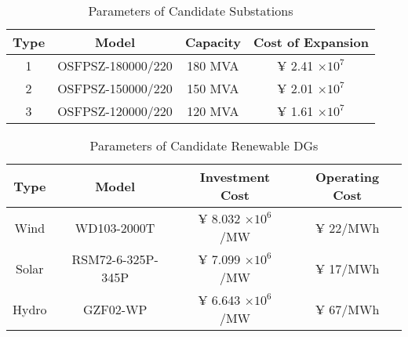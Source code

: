 \documentclass[a4paper,fleqn]{cas-dc}
\begin{document}
\begin{table}[htbp]\footnotesize
    \renewcommand{\familydefault}{\rmdefault}\normalfont
    \renewcommand{\arraystretch}{1.1}
    \setlength\tabcolsep{8pt}
    \centering
    {\color{blue}
    \caption{\textrm{Parameters of Candidate Substations}}
    \begin{tabularx}{\columnwidth}{cccc}
    \hline
    Type  & Model & Capacity & Cost of Expansion \\
    \hline
    1    & OSFPSZ-180000/220 & 180 MVA  & $ \yen $ 2.41 $\times 10^7$ \\
    2    & OSFPSZ-150000/220 & 150 MVA  & $ \yen $ 2.01 $\times 10^7$ \\
    3    & OSFPSZ-120000/220 & 120 MVA  & $ \yen $ 1.61 $\times 10^7$ \\
    \hline
    \end{tabularx}
    \label{tab_cost_subs}
    }
\end{table}

\begin{table}[htbp]\footnotesize
    \renewcommand{\familydefault}{\rmdefault}\normalfont
    \renewcommand{\arraystretch}{1.1}
    \setlength\tabcolsep{5pt}
    \centering
    {\color{blue}
    \caption{\textrm{Parameters of Candidate Renewable DGs}}
    \begin{tabularx}{\columnwidth}{cccc}
    \hline
    Type   & Model & Investment Cost & Operating Cost \\
    \hline
    Wind   & WD103-2000T       & $ \yen $ 8.032 $\times 10^6$/MW & $ \yen $ 22/MWh \\
    Solar  & RSM72-6-325P-345P & $ \yen $ 7.099 $\times 10^6$/MW & $ \yen $ 17/MWh \\
    Hydro  & GZF02-WP          & $ \yen $ 6.643 $\times 10^6$/MW & $ \yen $ 67/MWh \\
    \hline
    \end{tabularx}
    \label{tab_cost_dgs}
    }
\end{table}
\end{document}
